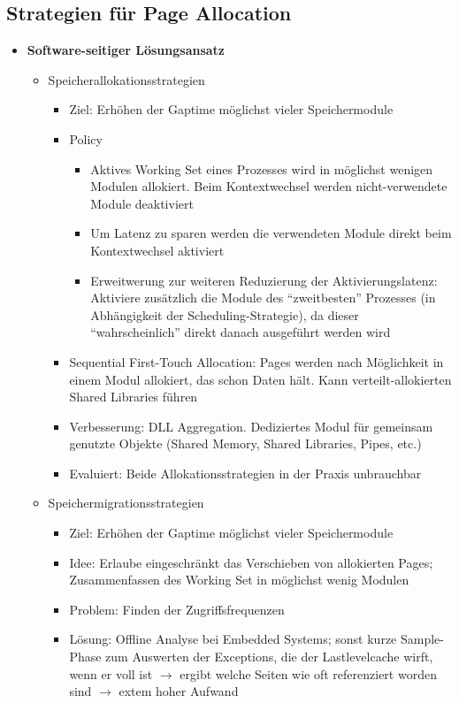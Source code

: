 \subsection{Strategien für Page Allocation}
\begin{itemize}
	\item \textbf{Software-seitiger Lösungsansatz}
	\begin{itemize}
		\item Speicherallokationsstrategien
		\begin{itemize}
			\item Ziel: Erhöhen der Gaptime möglichst vieler Speichermodule
			\item Policy
			\begin{itemize}
				\item Aktives Working Set eines Prozesses wird in möglichst wenigen Modulen allokiert. Beim Kontextwechsel werden nicht-verwendete Module deaktiviert
				\item Um Latenz zu sparen werden die verwendeten Module direkt beim Kontextwechsel aktiviert
				\item Erweitwerung zur weiteren Reduzierung der Aktivierungslatenz: Aktiviere zusätzlich die Module des "`zweitbesten"' Prozesses (in Abhängigkeit der Scheduling-Strategie), da dieser "`wahrscheinlich"' direkt danach ausgeführt werden wird
			\end{itemize}
			\item Sequential First-Touch Allocation: Pages werden nach Möglichkeit in einem Modul allokiert, das schon Daten hält. Kann verteilt-allokierten Shared Libraries führen
			\item Verbesserung: DLL Aggregation. Dediziertes Modul für gemeinsam genutzte Objekte (Shared Memory, Shared Libraries, Pipes, etc.)
			\item Evaluiert: Beide Allokationsstrategien in der Praxis unbrauchbar
		\end{itemize}
		\item Speichermigrationsstrategien
		\begin{itemize}
			\item Ziel: Erhöhen der Gaptime möglichst vieler Speichermodule
			\item Idee: Erlaube eingeschränkt das Verschieben von allokierten Pages; Zusammenfassen des Working Set in möglichst wenig Modulen
			\item Problem: Finden der Zugriffsfrequenzen
			\item Lösung: Offline Analyse bei Embedded Systems; sonst kurze Sample-Phase zum Auswerten der Exceptions, die der Lastlevelcache wirft, wenn er voll ist \(\rightarrow\) ergibt welche Seiten wie oft referenziert worden sind \(\rightarrow\) extem hoher Aufwand

\end{itemize}
\end{itemize}
\end{itemize}
